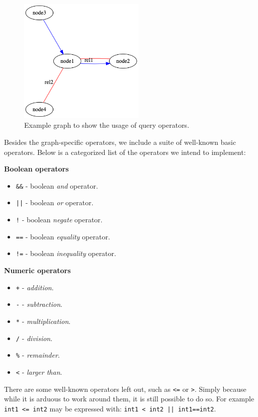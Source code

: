\begin{figure}[H]
    \centering
    \includegraphics[width=6cm]{figures/syntax_section/syntax_query_operators}
    \caption{Example graph to show the usage of query operators.}
    \label{fig:syntax_query_operators_example_out}
\end{figure}

Besides the graph-specific operators, we include a suite of well-known basic operators.
Below is a categorized list of the operators we intend to implement:


\textbf{Boolean operators}
\begin{itemize}
    \item \lstinline{&&} - boolean \emph{and} operator.
    \item \lstinline{||} - boolean \emph{or} operator.
    \item \lstinline{!} - boolean \emph{negate} operator.
    \item \lstinline{==} - boolean \emph{equality} operator.
    \item \lstinline{!=} - boolean \emph{inequality} operator.

\end{itemize}

\textbf{Numeric operators}
\begin{itemize}
    \item \lstinline{+} - \emph{addition}.
    \item \lstinline{-} - \emph{subtraction}.
    \item \lstinline{*} - \emph{multiplication}.
    \item \lstinline{/} - \emph{division}.
    \item \lstinline{%} - \emph{remainder}.
    \item \lstinline{<} - \emph{larger than}.
\end{itemize}

There are some well-known operators left out, such as \lstinline{<=} or \lstinline{>}.
Simply because while it is arduous to work around them, it is still possible to do so.
For example  \lstinline{int1 <= int2} may be expressed with:  \lstinline{int1 < int2 || int1==int2}.

